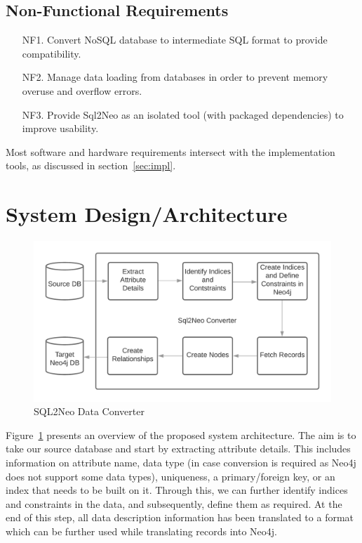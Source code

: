 \documentclass[12pt]{article}
\newcommand{\sectionfontstyle}{\fontsize{16pt}{1em}\usefont{T1}{phv}{b}{n}}
\begin{document}
    \subsection{Non-Functional Requirements}
    \begin{enumerate}
        \item [NF1.] Convert NoSQL database to intermediate SQL format to provide compatibility.
        \item [NF2.] Manage data loading from databases in order to prevent memory overuse and overflow errors.
        \item [NF3.] Provide Sql2Neo as an isolated tool (with packaged dependencies) to improve usability.
    \end{enumerate}

    Most software and hardware requirements intersect with the implementation tools, as discussed in section~\ref{sec:impl}.

    \newpage

    \section{\sectionfontstyle System Design/Architecture}
    \label{sec:sys_arch}
    \begin{figure}[htb!]
        \centering
        \includegraphics[width=155mm]{img/sql2neo_converter.png}
        \caption{SQL2Neo Data Converter}
        \label{fig:sql2neo_converter}
    \end{figure}

    Figure~\ref{fig:sql2neo_converter} presents an overview of the proposed system architecture. The aim is to take our source database and start by extracting attribute details. This includes information on attribute name, data type (in case conversion is required as Neo4j does not support some data types), uniqueness, a primary/foreign key, or an index that needs to be built on it. Through this, we can further identify indices and constraints in the data, and subsequently, define them as required. At the end of this step, all data description information has been translated to a format which can be further used while translating records into Neo4j.
\end{document}
